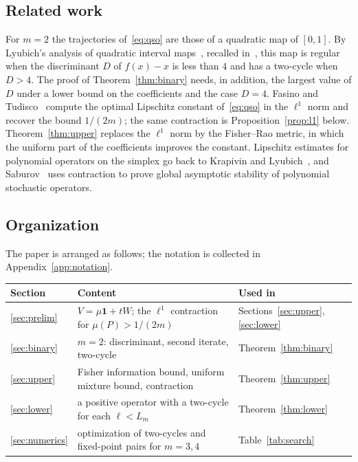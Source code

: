 \documentclass[11pt]{amsart}
\theoremstyle{definition}
\theoremstyle{remark}
\newcommand{\one}{\mathbf{1}}
\begin{document}
\subsection*{Related work}
For $m=2$ the trajectories of~\eqref{eq:qso} are those of a quadratic map of $[0,1]$. By Lyubich's analysis of
quadratic interval maps~\cite{Lyubich74}, recalled in~\cite[Theorem~3.1]{KHG22}, this map is regular when the discriminant $D$ of $f(x)-x$ is less
than $4$ and has a two-cycle when $D>4$. The proof of Theorem~\ref{thm:binary} needs, in addition, the largest value
of $D$ under a lower bound on the coefficients and the case $D=4$. Fasino and Tudisco~\cite[Theorem~6.1 and
Corollary~6.2]{FT20} compute the optimal Lipschitz constant of~\eqref{eq:qso} in the $\ell^1$ norm and recover the bound
$1/(2m)$; the same contraction is Proposition~\ref{prop:l1} below. Theorem~\ref{thm:upper} replaces the $\ell^1$ norm
by the Fisher--Rao metric, in which the uniform part of the coefficients improves the constant. Lipschitz estimates for
polynomial operators on the simplex go back to Krapivin and Lyubich~\cite{KL77}, and Saburov~\cite{S26} uses contraction
to prove global asymptotic stability of polynomial stochastic operators.

\subsection*{Organization}
The paper is arranged as follows; the notation is collected in Appendix~\ref{app:notation}.
\begin{center}
\begin{tabular}{lll}
\toprule
Section & Content & Used in\\
\midrule
\ref{sec:prelim} & $V=\mu\one+tW$; the $\ell^1$ contraction for $\mu(P)>1/(2m)$ & Sections~\ref{sec:upper}, \ref{sec:lower}\\
\ref{sec:binary} & $m=2$: discriminant, second iterate, two-cycle & Theorem~\ref{thm:binary}\\
\ref{sec:upper} & Fisher information bound, uniform mixture bound, contraction & Theorem~\ref{thm:upper}\\
\ref{sec:lower} & a positive operator with a two-cycle for each $\ell<L_m$ & Theorem~\ref{thm:lower}\\
\ref{sec:numerics} & optimization of two-cycles and fixed-point pairs for $m=3,4$ & Table~\ref{tab:search}\\
\bottomrule
\end{tabular}
\end{center}
\end{document}
